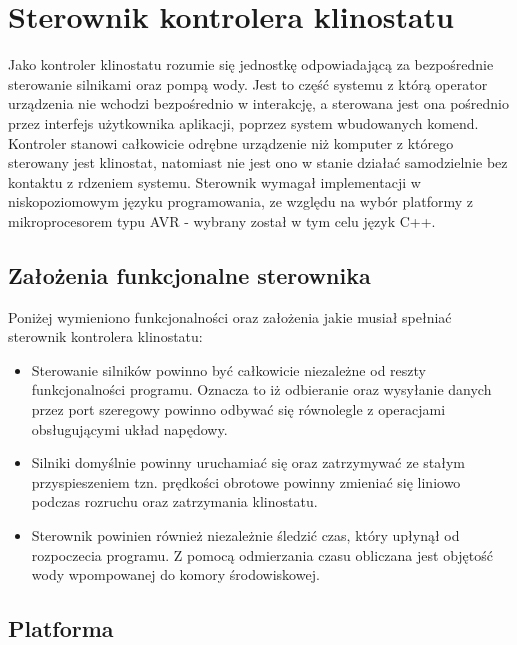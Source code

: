 \graphicspath{{./Sterownik/images}}

\chapter{Sterownik kontrolera klinostatu}

Jako kontroler klinostatu rozumie się jednostkę odpowiadającą za bezpośrednie sterowanie silnikami oraz pompą wody. Jest to część systemu z którą operator urządzenia nie wchodzi bezpośrednio w interakcję, a sterowana jest ona pośrednio przez interfejs użytkownika aplikacji, poprzez system wbudowanych komend. Kontroler stanowi całkowicie odrębne urządzenie niż komputer z którego sterowany jest klinostat, natomiast nie jest ono w stanie działać samodzielnie bez kontaktu z rdzeniem systemu. Sterownik wymagał implementacji w niskopoziomowym języku programowania, ze względu na wybór platformy z mikroprocesorem typu AVR - wybrany został w tym celu język C++.
\section{Założenia funkcjonalne sterownika}

Poniżej wymieniono funkcjonalności oraz założenia jakie musiał spełniać sterownik kontrolera klinostatu:

\begin{itemize}
	
	\item Sterowanie silników powinno być całkowicie niezależne od reszty funkcjonalności programu. Oznacza to iż odbieranie oraz wysyłanie danych przez port szeregowy powinno odbywać się równolegle z operacjami obsługującymi układ napędowy.
	\item Silniki domyślnie powinny uruchamiać się oraz zatrzymywać ze stałym przyspieszeniem tzn. prędkości obrotowe powinny zmieniać się liniowo podczas rozruchu oraz zatrzymania klinostatu.
	\item Sterownik powinien również niezależnie śledzić czas, który upłynął od rozpoczecia programu. Z pomocą odmierzania czasu obliczana jest objętość wody wpompowanej do komory środowiskowej.

\end{itemize}


\section{Platforma}

